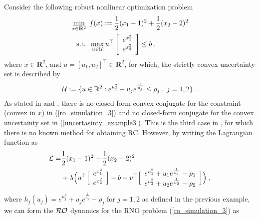 \documentclass[journal,twoside,web]{ieeecolor}
\begin{document}
Consider the following robust nonlinear optimization problem
\begin{align} \label{ro_simulation_3}
&\min_{x \in \mathbf{R}^2} \;f(x):=\frac{1}{2}(x_1-1)^2+\frac{1}{2}(x_2-2)^2\\
&\;\;\;\text{s.t.}\;\;\max_{u\in {\cal U}} u^\top \left[\begin{array}{ccl}e^{x_1^2}\\e^{x_2^2} \end{array}\right] \leq b\;,\;\nonumber
\end{align}
where $x \in \mathbf{R}^2$, and $u=[u_1, u_2]^\top \in \mathbf{R}^2$, for which, the strictly convex uncertainty set is described by
\begin{align} \label{uncertasinty_example3}
{\cal U}:=\{u \in \mathbb{R}^{2}:e^{u_j^2}+u_j e^{\frac{1}{u_j}} \leq \rho_j\;,\; j=1,2\}\;.
\end{align}
As stated in \cite{bental20152} and \cite{gorissen20152}, there is no closed-form convex conjugate for the constraint (convex in $x$) in (\ref{ro_simulation_3}) and no closed-form conjugate for the convex uncertainty set in (\ref{uncertasinty_example3}). This is the third case in \cite[~Table 1]{gorissen20152}, for which there is no known method for obtaining RC. However, by writing the Lagrangian function as
\begin{align*}
{\cal L}=&\frac{1}{2}(x_1-1)^2+\frac{1}{2}(x_2-2)^2\\
&+\lambda \Big(u^\top \Big[\begin{array}{ccl}e^{x_1^2}\\e^{x_2^2} \end{array}\Big]-b-v^\top \Big[\begin{array}{cc} e^{u_1^2}+u_1 e^{\frac{1}{u_1}}-\rho_1 \\ e^{u_2^2}+u_2 e^{\frac{1}{u_2}}-\rho_2 \end{array}\Big]\Big)\;,
\end{align*}
where $h_j(u_j)=e^{u_j^2}+u_j e^{\frac{1}{u_j}}-\rho_j$ for $j=1,2$ as defined in the previous example, we can form the ${\cal RO}$ dynamics for the RNO problem (\ref{ro_simulation_3}) as
\end{document}
